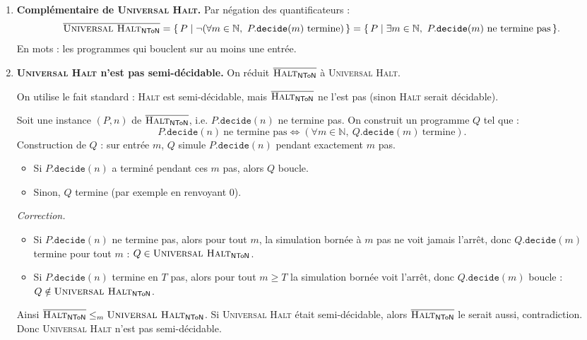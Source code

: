\begin{exercice}
\begin{corrections}
\begin{enumerate}
    \item \textbf{Complémentaire de \textsc{Universal Halt}.}
      Par négation des quantificateurs :
      \[
      \overline{\textsc{Universal Halt}_\mathsf{NToN}}
      = \{\, P \mid \neg(\forall m\in\mathbb{N},\ P.\texttt{decide}(m)\ \text{termine}) \,\}
      = \{\, P \mid \exists m\in\mathbb{N},\ P.\texttt{decide}(m)\ \text{ne termine pas} \,\}.
      \]
      En mots : les programmes qui bouclent sur au moins une entrée.

    \item \textbf{\textsc{Universal Halt} n'est pas semi-décidable.}
      On réduit \(\overline{\textsc{Halt}_\mathsf{NToN}}\) à \textsc{Universal Halt}.

      On utilise le fait standard : \textsc{Halt} est semi-décidable, mais
      \(\overline{\textsc{Halt}_\mathsf{NToN}}\) ne l'est pas (sinon \textsc{Halt} serait décidable).

      Soit une instance $(P,n)$ de \(\overline{\textsc{Halt}_\mathsf{NToN}}\), i.e. $P.\texttt{decide}(n)$ ne termine pas.
      On construit un programme $Q$ tel que :
      \[
      P.\texttt{decide}(n)\ \text{ne termine pas}
      \iff
      (\forall m\in\mathbb{N},\ Q.\texttt{decide}(m)\ \text{termine}).
      \]
      Construction de $Q$ : sur entrée $m$, $Q$ simule $P.\texttt{decide}(n)$ pendant exactement $m$ pas.
      \begin{itemize}
      \item Si $P.\texttt{decide}(n)$ a terminé pendant ces $m$ pas, alors $Q$ boucle.
      \item Sinon, $Q$ termine (par exemple en renvoyant $0$).
      \end{itemize}

      \emph{Correction.}
      \begin{itemize}
      \item Si $P.\texttt{decide}(n)$ ne termine pas, alors pour tout $m$, la simulation bornée à $m$ pas ne voit jamais l'arrêt,
        donc $Q.\texttt{decide}(m)$ termine pour tout $m$ : $Q\in\textsc{Universal Halt}_\mathsf{NToN}$.
      \item Si $P.\texttt{decide}(n)$ termine en $T$ pas, alors pour tout $m\ge T$ la simulation bornée voit l'arrêt,
        donc $Q.\texttt{decide}(m)$ boucle : $Q\notin\textsc{Universal Halt}_\mathsf{NToN}$.
      \end{itemize}

      Ainsi \(\overline{\textsc{Halt}_\mathsf{NToN}} \le_m \textsc{Universal Halt}_\mathsf{NToN}\).
      Si \textsc{Universal Halt} était semi-décidable, alors
      \(\overline{\textsc{Halt}_\mathsf{NToN}}\) le serait aussi, contradiction. Donc
      \textsc{Universal Halt} n'est pas semi-décidable.

    \end{enumerate}

  \end{corrections}

  \fi

\end{exercice}
